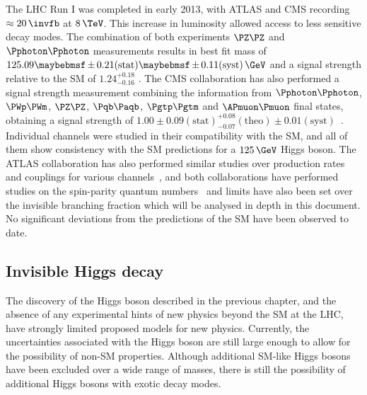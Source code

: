 The \gls{LHC} Run I was completed in early 2013, with ATLAS and \gls{CMS} recording $\approx20\,\invfb$ at $8\,\TeV$. This increase in luminosity allowed access to less sensitive decay modes. The combination of both experiments $\PZ\PZ$ and $\Pphoton\Pphoton$ measurements results in best fit mass of $125.09 \pm 0.21(\text{stat}) \pm 0.11(\text{syst})\,\GeV$ and a signal strength relative to the \gls{SM} of $1.24^{+0.18}_{-0.16}$ \cite{ARTICLE:CombinedMeasurementOfTheHiggsBoson}. The \gls{CMS} collaboration has also performed a signal strength measurement combining the information from $\Pphoton\Pphoton$, $\PWp\PWm$, $\PZ\PZ$, $\Pqb\Paqb$, $\Pgtp\Pgtm$ and $\APmuon\Pmuon$ final states, obtaining a signal strength of $1.00\pm0.09(\text{stat})^{+0.08}_{-0.07}(\text{theo})\pm0.01(\text{syst})$~\cite{ARTICLE:CMScomb}. Individual channels were studied in their compatibility with the \gls{SM}, and all of them show consistency with the \gls{SM} predictions for a $125\,\GeV$ Higgs boson. The ATLAS collaboration has also performed similar studies over production rates and couplings for various channels~\cite{Aad:2014eva,Aad:2014lwa,Aad:2015vsa}, and both collaborations have performed studies on the spin-parity quantum numbers~\cite{Chatrchyan:2013mxa,Chatrchyan:2013iaa,Aad:2013xqa} and limits have also been set over the invisible branching fraction which will be analysed in depth in this document. No significant deviations from the predictions of the \gls{SM} have been observed to date.

\subsection{Invisible Higgs decay}
\label{SUBSECTION:Theory_SM_InvisibleHiggsDecay}


The discovery of the Higgs boson described in the previous chapter, and the absence of any experimental hints of new physics beyond the \gls{SM} at the \gls{LHC}, have strongly limited proposed models for new physics. Currently, the uncertainties associated with the Higgs boson are still large enough to allow for the possibility of non-\gls{SM} properties. Although additional \gls{SM}-like Higgs bosons have been excluded over a wide range of masses, there is still the possibility of additional Higgs bosons with exotic decay modes.


